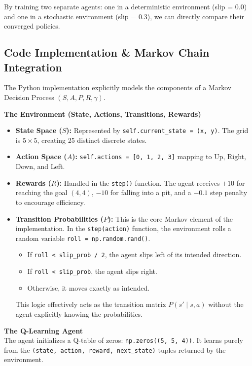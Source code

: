 By training two separate agents: one in a deterministic environment (slip = $0.0$) and one in a stochastic environment (slip = $0.3$), we can directly compare their converged policies.

\vspace{0.5cm}
\subsection{\textcolor{secondary}{Code Implementation \& Markov Chain Integration}}
The Python implementation explicitly models the components of a Markov Decision Process $(S, A, P, R, \gamma)$.

\textbf{\textcolor{primary}{The Environment (State, Actions, Transitions, Rewards)}}
\begin{itemize}
    \item \textbf{State Space ($S$):} Represented by \texttt{self.current\_state = (x, y)}. The grid is $5 \times 5$, creating 25 distinct discrete states.
    \item \textbf{Action Space ($A$):} \texttt{self.actions = [0, 1, 2, 3]} mapping to Up, Right, Down, and Left.
    \item \textbf{Rewards ($R$):} Handled in the \texttt{step()} function. The agent receives $+10$ for reaching the goal $(4,4)$, $-10$ for falling into a pit, and a $-0.1$ step penalty to encourage efficiency.
    \item \textbf{Transition Probabilities ($P$):} This is the core Markov element of the implementation. In the \texttt{step(action)} function, the environment rolls a random variable \texttt{roll = np.random.rand()}.
    \begin{itemize}
        \item If \texttt{roll < slip\_prob / 2}, the agent slips left of its intended direction.
        \item If \texttt{roll < slip\_prob}, the agent slips right.
        \item Otherwise, it moves exactly as intended.
    \end{itemize}
    This logic effectively acts as the transition matrix $P(s' \mid s, a)$ without the agent explicitly knowing the probabilities.
\end{itemize}

\textbf{\textcolor{primary}{The Q-Learning Agent}} \\
The agent initializes a Q-table of zeros: \texttt{np.zeros((5, 5, 4))}. It learns purely from the \texttt{(state, action, reward, next\_state)} tuples returned by the environment.

